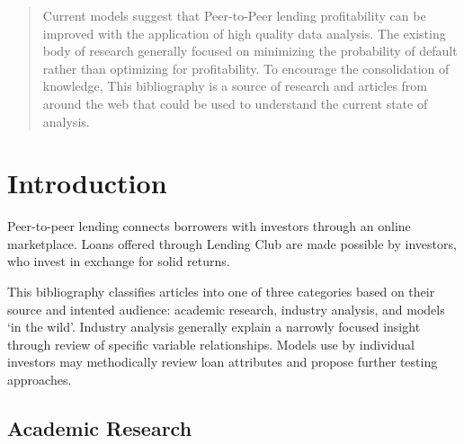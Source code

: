 \documentclass[conference,final,]{IEEEtran}
\begin{document}
\begin{abstract}
Current models suggest that Peer-to-Peer lending profitability can be
improved with the application of high quality data analysis. The
existing body of research generally focused on minimizing the
probability of default rather than optimizing for profitability. To
encourage the consolidation of knowledge, This bibliography is a source
of research and articles from around the web that could be used to
understand the current state of analysis.
\end{abstract}





\maketitle


%
\IEEEpeerreviewmaketitle


\section{Introduction}\label{introduction}

Peer-to-peer lending connects borrowers with investors through an online
marketplace. Loans offered through Lending Club are made possible by
investors, who invest in exchange for solid returns.

This bibliography classifies articles into one of three categories based
on their source and intented audience: academic research, industry
analysis, and models `in the wild'. Industry analysis generally explain
a narrowly focused insight through review of specific variable
relationships. Models use by individual investors may methodically
review loan attributes and propose further testing approaches.

\subsection{Academic Research}\label{academic-research}
\end{document}
